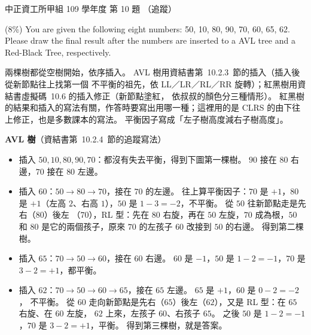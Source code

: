 \begin{pastexam}[label={px:ccu-109-swa-05}]{中正資工所甲組 109 學年度 第 10 題}
（追蹤）

(8\%) You are given the following eight numbers: 50, 10, 80, 90, 70, 60, 65, 62. Please draw the
final result after the numbers are inserted to a AVL tree and a Red-Black Tree, respectively.
\end{pastexam}

\begin{pastsoln}
兩棵樹都從空樹開始，依序插入。 AVL 樹用資結書第~10.2.3~節的插入（插入後從新節點往上找第一個
不平衡的祖先，依 LL／LR／RL／RR 旋轉）；紅黑樹用資結書虛擬碼~10.6 的插入修正（新節點塗紅，
依叔叔的顏色分三種情形）。 紅黑樹的結果和插入的寫法有關，作答時要寫出用哪一種；這裡用的是
CLRS 的由下往上修正，也是多數課本的寫法。 平衡因子寫成「左子樹高度減右子樹高度」。

\textbf{AVL 樹}（資結書第~10.2.4~節的追蹤寫法）
\begin{itemize}
\item 插入 $50, 10, 80, 90, 70$：都沒有失去平衡，得到下圖第一棵樹。 $90$ 接在 $80$ 右邊，$70$ 接在
$80$ 左邊。
\item 插入 $60$：$50 \to 80 \to 70$，接在 $70$ 的左邊。 往上算平衡因子：$70$ 是 $+1$，$80$ 是
$+1$（左高 $2$、右高 $1$），$50$ 是 $1 - 3 = -2$，不平衡。 從 $50$ 往新節點走是先右（$80$）後左
（$70$），RL 型：先在 $80$ 右旋，再在 $50$ 左旋，$70$ 成為根，$50$ 和 $80$ 是它的兩個孩子，原來
$70$ 的左孩子 $60$ 改接到 $50$ 的右邊。 得到第二棵樹。
\item 插入 $65$：$70 \to 50 \to 60$，接在 $60$ 右邊。 $60$ 是 $-1$，$50$ 是 $1 - 2 = -1$，$70$ 是
$3 - 2 = +1$，都平衡。
\item 插入 $62$：$70 \to 50 \to 60 \to 65$，接在 $65$ 左邊。 $65$ 是 $+1$，$60$ 是 $0 - 2 = -2$，
不平衡。 從 $60$ 走向新節點是先右（$65$）後左（$62$），又是 RL 型：在 $65$ 右旋、在 $60$ 左旋，
$62$ 上來，左孩子 $60$、右孩子 $65$。 之後 $50$ 是 $1 - 2 = -1$，$70$ 是 $3 - 2 = +1$，平衡。
得到第三棵樹，就是答案。
\end{itemize}


\end{pastsoln}
